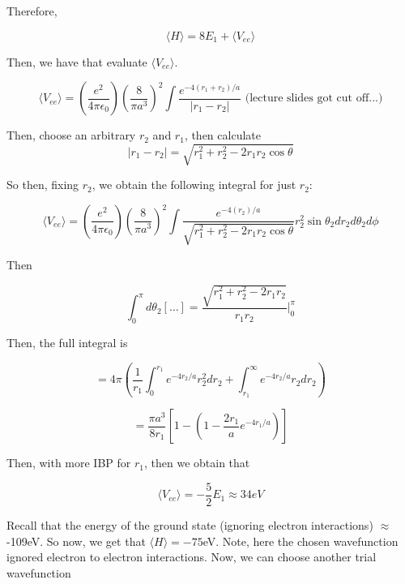 \documentclass{article}
\newtheorem{one minute paper}[theorem]{One Minute Paper}
\begin{document}
Therefore, 

\begin{equation}
    \langle H \rangle = 8E_1 + \langle V_{ee} \rangle
\end{equation}

Then, we have that evaluate $\langle V_{ee} \rangle$. 

\begin{equation}
    \langle V_{ee} \rangle = \left( \frac{e^2}{4\pi \epsilon_0} \right)\left( \frac{8}{\pi a^3} \right)^2 \int \frac{e^{-4(r_1 + r_2)/a}}{|r_1 - r_2|} \text{ (lecture slides got cut off...)}
\end{equation}

Then, choose an arbitrary $r_2$ and $r_1$, then calculate $$|r_1 - r_2| = \sqrt{r_1^2 + r_2^2 - 2r_1r_2 \cos\theta}$$

So then, fixing $r_2$, we obtain the following integral for just $r_2$:

\begin{equation}
    \langle V_{ee} \rangle = \left( \frac{e^2}{4\pi \epsilon_0} \right)\left( \frac{8}{\pi a^3} \right)^2 \int \frac{e^{-4(r_2)/a}}{\sqrt{r_1^2 + r_2^2 - 2r_1r_2 \cos\theta}}r_2^2 \sin\theta_2 dr_2 d\theta_2 d\phi
\end{equation}

Then 

\begin{equation}
    \int_0^{\pi}d\theta_2 [\dots] = \frac{\sqrt{r_1^2 + r_2^2 - 2r_1r_2}}{r_1r_2}\bigg|_0^{\pi}
\end{equation}

Then, the full integral is 

\begin{equation}
    = 4\pi \left( \frac{1}{r_1}\int_{0}^{r_1}e^{-4r_2/a} r_2^2dr_2 + \int_{r_1}^{\infty}e^{-4r_2/a}r_2dr_2\right)
\end{equation}

\begin{equation}
    = \frac{\pi a^3}{8r_1}\left[ 1 - \left( 1 - \frac{2r_1}{a} e^{-4r_1/a}\right) \right]
\end{equation}

Then, with more IBP for $r_1$, then we obtain that 

\begin{equation}
    \langle V_{ee} \rangle = -\frac{5}{2}E_1 \approx 34 eV
\end{equation}

Recall that the energy of the ground state (ignoring electron interactions) $\approx$ -109eV. So now, we get that $\langle H \rangle = -75$eV. Note, here the chosen wavefunction ignored electron to electron interactions. Now, we can choose another trial wavefunction 
\end{document}
